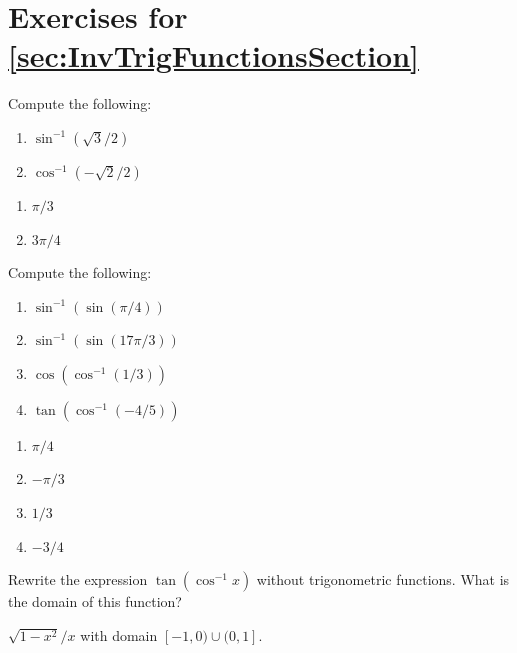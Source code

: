 \section*{Exercises for \ref{sec:InvTrigFunctionsSection}}

\begin{enumialphparenastyle}

\begin{ex}
Compute the following:
\begin{multicols}{2}
\begin{enumerate}
	\item	$\sin^{-1}(\sqrt{3}/2)$
	\item	$\cos^{-1}(-\sqrt{2}/2)$
\end{enumerate}
\end{multicols}
\begin{sol}
\begin{enumerate}
	\item	$\pi/3$
	\item	$3\pi/4$
\end{enumerate}
\end{sol}
\end{ex}

\begin{ex}
Compute the following:
\begin{multicols}{2}
\begin{enumerate}
	\item	$\sin^{-1}\left(\sin(\pi/4)\right)$
	\item	$\sin^{-1}\left(\sin(17\pi/3)\right)$
	\item	$\cos\left(\cos^{-1}(1/3)\right)$
	\item	$\tan\left(\cos^{-1}(-4/5)\right)$
\end{enumerate}
\end{multicols}
\begin{sol}
\begin{multicols}{2}
\begin{enumerate}
	\item	$\pi/4$
	\item	$-\pi/3$
	\item	$1/3$
	\item	$-3/4$
\end{enumerate}
\end{multicols}
\end{sol}
\end{ex}

\begin{ex}
Rewrite the expression $\tan\left(\cos^{-1}x\right)$
without trigonometric functions. What is the domain of this function?
\begin{sol}
$\sqrt{1-x^2}/x$ with domain $[-1,0)\cup(0,1]$.
\end{sol}
\end{ex}

\end{enumialphparenastyle}